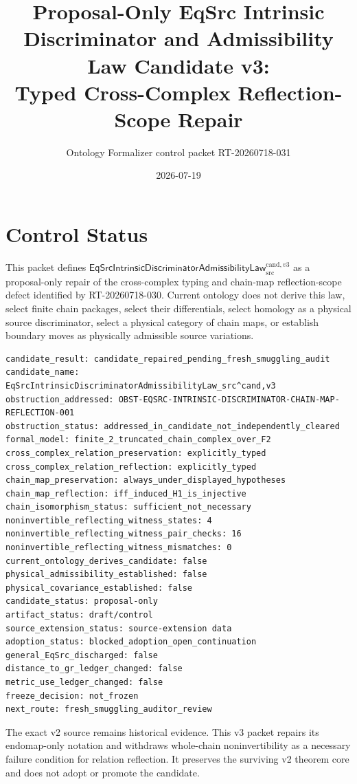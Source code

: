 \documentclass[11pt]{article}
\title{Proposal-Only EqSrc Intrinsic Discriminator and Admissibility Law Candidate v3:\\
Typed Cross-Complex Reflection-Scope Repair}
\author{Ontology Formalizer control packet RT-20260718-031}
\date{2026-07-19}
\begin{document}
\maketitle

\section{Control Status}

This packet defines
\(\mathsf{EqSrcIntrinsicDiscriminatorAdmissibilityLaw}^{\mathrm{cand},v3}_{\mathrm{src}}\)
as a proposal-only repair of the cross-complex typing and chain-map
reflection-scope defect identified by RT-20260718-030. Current ontology does
not derive this law, select finite chain packages, select their differentials,
select homology as a physical source discriminator, select a physical category
of chain maps, or establish boundary moves as physically admissible source
variations.

\begin{verbatim}
candidate_result: candidate_repaired_pending_fresh_smuggling_audit
candidate_name: EqSrcIntrinsicDiscriminatorAdmissibilityLaw_src^cand,v3
obstruction_addressed: OBST-EQSRC-INTRINSIC-DISCRIMINATOR-CHAIN-MAP-REFLECTION-001
obstruction_status: addressed_in_candidate_not_independently_cleared
formal_model: finite_2_truncated_chain_complex_over_F2
cross_complex_relation_preservation: explicitly_typed
cross_complex_relation_reflection: explicitly_typed
chain_map_preservation: always_under_displayed_hypotheses
chain_map_reflection: iff_induced_H1_is_injective
chain_isomorphism_status: sufficient_not_necessary
noninvertible_reflecting_witness_states: 4
noninvertible_reflecting_witness_pair_checks: 16
noninvertible_reflecting_witness_mismatches: 0
current_ontology_derives_candidate: false
physical_admissibility_established: false
physical_covariance_established: false
candidate_status: proposal-only
artifact_status: draft/control
source_extension_status: source-extension data
adoption_status: blocked_adoption_open_continuation
general_EqSrc_discharged: false
distance_to_gr_ledger_changed: false
metric_use_ledger_changed: false
freeze_decision: not_frozen
next_route: fresh_smuggling_auditor_review
\end{verbatim}

The exact v2 source remains historical evidence. This v3 packet repairs its
endomap-only notation and withdraws whole-chain noninvertibility as a
necessary failure condition for relation reflection. It preserves the
surviving v2 theorem core and does not adopt or promote the candidate.
\end{document}
